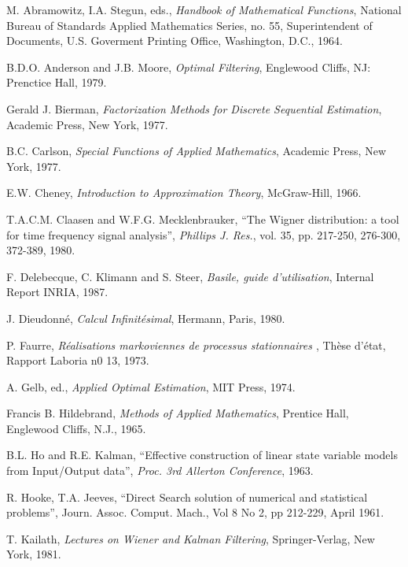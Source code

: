 \begin{thebibliography}{99}

\label{ref}

 M. Abramowitz, I.A. Stegun, eds., {\em Handbook of Mathematical Functions}, National Bureau of Standards Applied Mathematics Series, no. 55, Superintendent of Documents, U.S. Goverment Printing Office, Washington, D.C., 1964.

 B.D.O. Anderson and J.B. Moore, {\em Optimal Filtering}, Englewood Cliffs, NJ: Prenctice Hall, 1979.

 Gerald J. Bierman, {\em Factorization Methods for Discrete Sequential Estimation}, Academic Press, New York, 1977.


 B.C. Carlson, {\em Special Functions of Applied Mathematics}, Academic Press, New York, 1977.

 E.W. Cheney, {\em Introduction to Approximation Theory}, McGraw-Hill, 1966.

 T.A.C.M. Claasen and W.F.G. Mecklenbrauker, ``The Wigner distribution: a tool for time frequency signal analysis'', {\em Phillips J. Res.}, vol. 35, pp. 217-250, 276-300, 372-389, 1980.

 F. Delebecque, C. Klimann and S. Steer, {\em Basile, guide d'utilisation}, Internal Report INRIA, 1987.

 J. Dieudonn\'e, {\em Calcul Infinit\'esimal}, Hermann, Paris, 1980.

 P. Faurre, {\em R\'ealisations markoviennes de processus stationnaires \em}, Th\`ese d'\'etat, Rapport Laboria n0 13, 1973.

 A. Gelb, ed., {\em Applied Optimal Estimation}, MIT Press, 1974.

 Francis B. Hildebrand, {\em Methods of Applied Mathematics}, Prentice Hall, Englewood Cliffs, N.J., 1965.

 B.L. Ho and R.E. Kalman, ``Effective construction of linear state variable models from Input/Output data'', {\em Proc. 3rd Allerton Conference}, 1963.

 R. Hooke, T.A. Jeeves, ``Direct Search solution of numerical and statistical problems'', Journ. Assoc. Comput. Mach., Vol 8 No 2, pp 212-229, April 1961.

 T. Kailath, {\em Lectures on Wiener and Kalman Filtering}, Springer-Verlag, New York, 1981.


\end{thebibliography}
